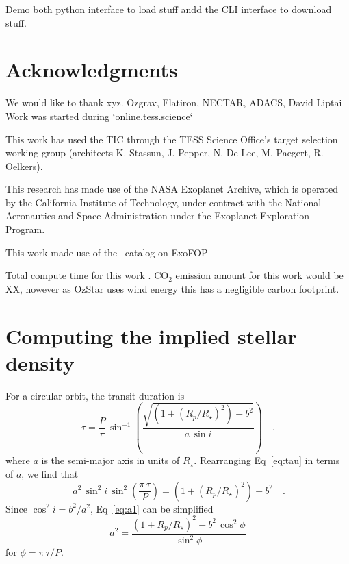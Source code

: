 \documentclass[floatfix,ApJL,twocolumn]{aastex631}
\begin{document}
Demo both python interface to load stuff andd the CLI interface to download stuff.




\section*{Acknowledgments}{

We would like to thank xyz.
Ozgrav, Flatiron, NECTAR, ADACS, David Liptai
Work was started during `online.tess.science`

This work has used the TIC through the TESS Science Office’s target selection working group (architects K. Stassun, J. Pepper, N. De Lee, M. Paegert, R. Oelkers).

This research has made use of the NASA Exoplanet Archive, which is operated by the California Institute of Technology, under contract with the National Aeronautics and Space Administration under the Exoplanet Exploration Program.

This work made use of the \tess\ catalog on ExoFOP

Total compute time for this work \red{\cpuHrs} . CO$_2$ emission amount for this work would be XX, however as OzStar uses wind energy this has a negligible carbon footprint.

}

\vspace{5mm}



{}


\appendix

\section{Computing the implied stellar density}\label{apdx:stellar_density}
For a circular orbit, the transit duration is \citep{Winn:2010:arXiv}
\begin{equation}~\label{eq:tau}
  \tau = \frac{P}{\pi}\,\sin^{-1}\left( \frac{\sqrt{(1 + (R_{p}/R_{\star})^2) - b^2}}{a\,\sin i} \right) \quad. \,
\end{equation}
where $a$ is the semi-major axis in units of $R_\star$. 
Rearranging Eq~\ref{eq:tau} in terms of $a$, we find that
\begin{equation}~\label{eq:a1}
  a^2\,\sin^2 i\,\sin^2\left(\frac{\pi\,\tau}{P}\right) = (1 + (R_{p}/R_{\star})^2) - b^2 \quad.
\end{equation}
Since $\cos^2 i = b^2 / a^2$, Eq~\ref{eq:a1} can be simplified
\begin{equation}
  a^2 = \frac{(1 + R_{p}/R_{\star})^2 - b^2\,\cos^2\phi}{\sin^2\phi}
\end{equation}
for $\phi = \pi\,\tau / P$.
\end{document}
